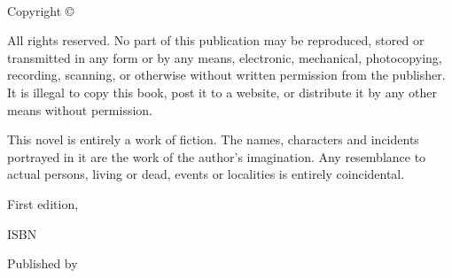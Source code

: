 
{\small
	\setlength{\parindent}{0em}\setlength{\parskip}{1em}
	
	~
	
	\vfill
	
	Copyright \copyright{} \editionyear{} \authorname
	
	All rights reserved. No part of this publication may be reproduced, stored or transmitted in any form or by any means, electronic, mechanical, photocopying, recording, scanning, or otherwise without written permission from the publisher. It is illegal to copy this book, post it to a website, or distribute it by any other means without permission.
	
	This novel is entirely a work of fiction. The names, characters and incidents portrayed in it are the work of the author’s imagination. Any resemblance to actual persons, living or dead, events or localities is entirely coincidental.
	
	First edition, \editionyear{}
	
	ISBN \isbn{}  %
	
	Published by \publisher{}
}
